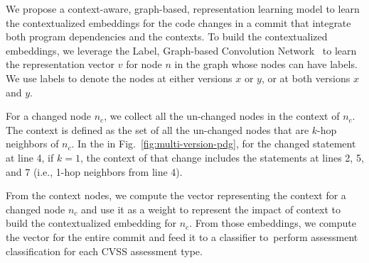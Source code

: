 We propose a context-aware, graph-based, representation learning model
to learn the contextualized embeddings for the code changes in a
commit that integrate both program dependencies and the contexts. To
build the contextualized embeddings, we leverage the Label,
Graph-based Convolution Network~\cite{label-gcn} to learn the
representation vector $v$ for node $n$ in the graph whose nodes
can have labels. We use labels to denote the nodes at either versions
$x$ or $y$, or at both versions $x$ and $y$.



For a changed node $n_c$, we collect all the un-changed nodes in the
context of $n_c$. The context is defined as the set of all the
un-changed nodes that are $k$-hop neighbors of $n_c$. In the
{\mvpdgxy} in Fig.~\ref{fig:multi-version-pdg}, for the changed
statement at line 4, if $k=1$, the context of that change includes the
statements at lines 2, 5, and 7 (i.e., 1-hop neighbors from line 4).




From the context nodes, we compute the vector representing the context
for a changed node $n_c$ and use it as a weight to represent the
impact of context to build the contextualized embedding for $n_c$.
From those embeddings, we compute the vector for the entire
commit and feed it to
a classifier to~per\-form assessment classification for each CVSS
assessment type.





